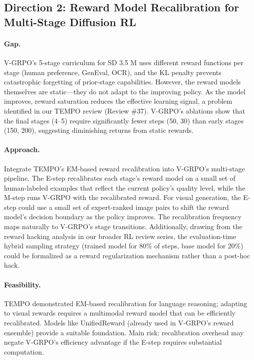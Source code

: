 \documentclass[11pt]{article}
\begin{document}
\subsection{Direction 2: Reward Model Recalibration for Multi-Stage Diffusion RL}

\paragraph{Gap.}
V-GRPO's 5-stage curriculum for SD 3.5 M uses different reward functions per stage (human preference, GenEval, OCR), and the KL penalty prevents catastrophic forgetting of prior-stage capabilities. However, the reward models themselves are static---they do not adapt to the improving policy. As the model improves, reward saturation reduces the effective learning signal, a problem identified in our TEMPO review (Review \#37). V-GRPO's ablations show that the final stages (4--5) require significantly fewer steps (50, 30) than early stages (150, 200), suggesting diminishing returns from static rewards.

\paragraph{Approach.}
Integrate TEMPO's EM-based reward recalibration into V-GRPO's multi-stage pipeline. The E-step recalibrates each stage's reward model on a small set of human-labeled examples that reflect the current policy's quality level, while the M-step runs V-GRPO with the recalibrated reward. For visual generation, the E-step could use a small set of expert-ranked image pairs to shift the reward model's decision boundary as the policy improves. The recalibration frequency maps naturally to V-GRPO's stage transitions. Additionally, drawing from the reward hacking analysis in our broader RL review series, the evaluation-time hybrid sampling strategy (trained model for 80\% of steps, base model for 20\%) could be formalized as a reward regularization mechanism rather than a post-hoc hack.

\paragraph{Feasibility.}
TEMPO demonstrated EM-based recalibration for language reasoning; adapting to visual rewards requires a multimodal reward model that can be efficiently recalibrated. Models like UnifiedReward (already used in V-GRPO's reward ensemble) provide a suitable foundation. Main risk: recalibration overhead may negate V-GRPO's efficiency advantage if the E-step requires substantial computation.
\end{document}
